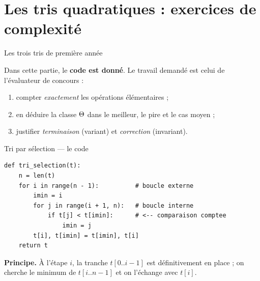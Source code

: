 \documentclass[11pt,aspectratio=169]{beamer}
\begin{document}
\section{Les tris quadratiques : exercices de complexité}

\begin{frame}{Les trois tris de première année}
\begin{center}
\end{center}
\vspace{4pt}
\begin{encadre}
\small
Dans cette partie, le \textbf{code est donné}. Le travail demandé est celui de
l'évaluateur de concours :
\begin{enumerate}\setlength\itemsep{1pt}
  \item compter \emph{exactement} les opérations élémentaires ;
  \item en déduire la classe $\Theta$ dans le meilleur, le pire et le cas moyen ;
  \item justifier \emph{terminaison} (variant) et \emph{correction} (invariant).
\end{enumerate}
\end{encadre}
\end{frame}

\begin{frame}[fragile]{Tri par sélection --- le code}
\begin{lstlisting}
def tri_selection(t):
    n = len(t)
    for i in range(n - 1):          # boucle externe
        imin = i
        for j in range(i + 1, n):   # boucle interne
            if t[j] < t[imin]:      # <-- comparaison comptee
                imin = j
        t[i], t[imin] = t[imin], t[i]
    return t
\end{lstlisting}
\begin{encadre}\small
\textbf{Principe.} À l'étape $i$, la tranche $t[0..i-1]$ est définitivement en place ;
on cherche le minimum de $t[i..n-1]$ et on l'échange avec $t[i]$.
\end{encadre}
\end{frame}
\end{document}
